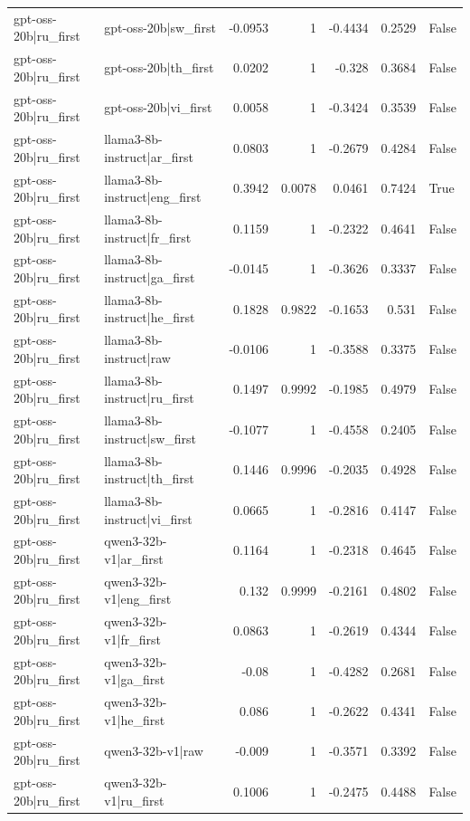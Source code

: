 \begin{table}
\begin{tabular}{l l r r r r l}
gpt-oss-20b|ru_first & gpt-oss-20b|sw_first & -0.0953 & 1 & -0.4434 & 0.2529 & False \\
gpt-oss-20b|ru_first & gpt-oss-20b|th_first & 0.0202 & 1 & -0.328 & 0.3684 & False \\
gpt-oss-20b|ru_first & gpt-oss-20b|vi_first & 0.0058 & 1 & -0.3424 & 0.3539 & False \\
gpt-oss-20b|ru_first & llama3-8b-instruct|ar_first & 0.0803 & 1 & -0.2679 & 0.4284 & False \\
gpt-oss-20b|ru_first & llama3-8b-instruct|eng_first & 0.3942 & 0.0078 & 0.0461 & 0.7424 & True \\
gpt-oss-20b|ru_first & llama3-8b-instruct|fr_first & 0.1159 & 1 & -0.2322 & 0.4641 & False \\
gpt-oss-20b|ru_first & llama3-8b-instruct|ga_first & -0.0145 & 1 & -0.3626 & 0.3337 & False \\
gpt-oss-20b|ru_first & llama3-8b-instruct|he_first & 0.1828 & 0.9822 & -0.1653 & 0.531 & False \\
gpt-oss-20b|ru_first & llama3-8b-instruct|raw & -0.0106 & 1 & -0.3588 & 0.3375 & False \\
gpt-oss-20b|ru_first & llama3-8b-instruct|ru_first & 0.1497 & 0.9992 & -0.1985 & 0.4979 & False \\
gpt-oss-20b|ru_first & llama3-8b-instruct|sw_first & -0.1077 & 1 & -0.4558 & 0.2405 & False \\
gpt-oss-20b|ru_first & llama3-8b-instruct|th_first & 0.1446 & 0.9996 & -0.2035 & 0.4928 & False \\
gpt-oss-20b|ru_first & llama3-8b-instruct|vi_first & 0.0665 & 1 & -0.2816 & 0.4147 & False \\
gpt-oss-20b|ru_first & qwen3-32b-v1|ar_first & 0.1164 & 1 & -0.2318 & 0.4645 & False \\
gpt-oss-20b|ru_first & qwen3-32b-v1|eng_first & 0.132 & 0.9999 & -0.2161 & 0.4802 & False \\
gpt-oss-20b|ru_first & qwen3-32b-v1|fr_first & 0.0863 & 1 & -0.2619 & 0.4344 & False \\
gpt-oss-20b|ru_first & qwen3-32b-v1|ga_first & -0.08 & 1 & -0.4282 & 0.2681 & False \\
gpt-oss-20b|ru_first & qwen3-32b-v1|he_first & 0.086 & 1 & -0.2622 & 0.4341 & False \\
gpt-oss-20b|ru_first & qwen3-32b-v1|raw & -0.009 & 1 & -0.3571 & 0.3392 & False \\
gpt-oss-20b|ru_first & qwen3-32b-v1|ru_first & 0.1006 & 1 & -0.2475 & 0.4488 & False \\

\end{tabular}
\end{table}
